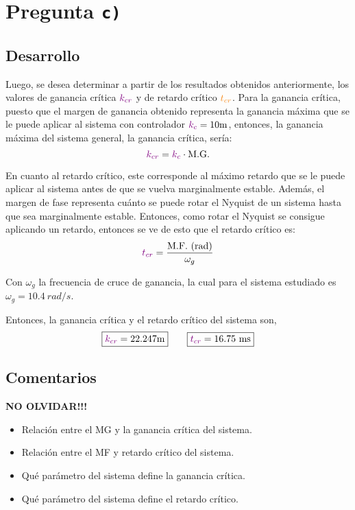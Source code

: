 \section{Pregunta \texttt{c)}}\label{pregunta-c}

\subsection{Desarrollo}

Luego, se desea determinar a partir de los resultados obtenidos anteriormente,
los valores de ganancia crítica $\mathbin{\color{violet}k_{cr}}$ y de retardo crítico $\nara{t_{cr}}$.
Para la ganancia crítica, puesto que el margen de ganancia obtenido representa
la ganancia máxima que se le puede aplicar al sistema con controlador $\mora{k_{c}} = 10\unit{m}$,
entonces, la ganancia máxima del sistema general, la ganancia crítica, sería:
\begin{equation}
  \mathbin{\color{violet}k_{cr}} = \mathbin{\color{violet}k_{c}} \cdot \text{M.G.}
\end{equation}

En cuanto al retardo crítico, este corresponde al máximo retardo que se le
puede aplicar al sistema antes de que se vuelva marginalmente estable. Además,
el margen de fase representa cuánto se puede rotar el Nyquist de un sistema
hasta que sea marginalmente estable. Entonces, como rotar el Nyquist se consigue
aplicando un retardo, entonces se ve de esto que el retardo crítico es:
\begin{equation}
  \mora{t_{cr}} = \frac{\te{M.F.}\ \te{(rad)}}{\omega_{g}}
\end{equation}

Con $\omega_{g}$ la frecuencia de cruce de ganancia, la cual para el sistema
estudiado es $\omega_{g} = 10.4\ \unit{rad/s}$.

Entonces, la ganancia crítica y el retardo crítico del sistema son,
\begin{equation}
  \boxed{\mora{k_{cr}} = 22.247\unit{m}} \qquad \boxed{\mora{t_{cr}} = 16.75\ \unit{ms}}
\end{equation}


\FloatBarrier
\subsection{Comentarios}

\textbf{NO OLVIDAR!!!}


\begin{itemize}
  \item Relación entre el MG y la ganancia crítica del sistema.
  \item Relación entre el MF y retardo crítico del sistema.
  \item Qué parámetro del sistema define la ganancia crítica.
  \item Qué parámetro del sistema define el retardo crítico.
\end{itemize}


